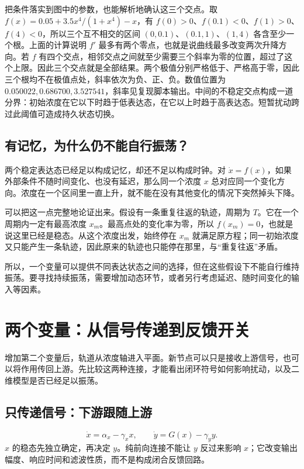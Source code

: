 \documentclass[11pt,a4paper,UTF8,fontset=fandol]{ctexart}
\begin{document}
把条件落实到图中的参数，也能解析地确认这三个交点。取 $f(x)=0.05+3.5x^4/(1+x^4)-x$，有 $f(0)>0$、$f(0.1)<0$、$f(1)>0$、$f(4)<0$，所以三个互不相交的区间 $(0,0.1)$、$(0.1,1)$、$(1,4)$ 各含至少一个根。上面的计算说明 $f'$ 最多有两个零点，也就是说曲线最多改变两次升降方向。若 $f$ 有四个交点，相邻交点之间就至少需要三个斜率为零的位置，超过了这个上限。因此三个交点就是全部结果。两个极值分别严格低于、严格高于零，因此三个根均不在极值点处，斜率依次为负、正、负。数值位置为 $0.050022,0.686700,3.527541$，斜率见复现脚本输出。中间的不稳定交点构成一道分界：初始浓度在它以下时趋于低表达态，在它以上时趋于高表达态。短暂扰动跨过此阈值可造成持久状态切换。

\subsection{有记忆，为什么仍不能自行振荡？}
两个稳定表达态已经足以构成记忆，却还不足以构成时钟。对 $\dot x=f(x)$，如果外部条件不随时间变化、也没有延迟，那么同一个浓度 $x$ 总对应同一个变化方向。浓度在一个区间里一直上升，就不能在没有其他变化的情况下突然掉头下降。

可以把这一点完整地论证出来。假设有一条重复往返的轨迹，周期为 $T$。它在一个周期内一定有最高浓度 $x_m$。最高点处的变化率为零，所以 $f(x_m)=0$，也就是说这里已经是稳态。从这个浓度出发，始终停在 $x_m$ 就满足原方程；同一初始浓度又只能产生一条轨迹，因此原来的轨迹也只能停在那里，与“重复往返”矛盾。

所以，一个变量可以提供不同表达状态之间的选择，但在这些假设下不能自行维持振荡。要寻找持续振荡，需要增加动态环节，或者另行考虑延迟、随时间变化的输入等因素。

\section{两个变量：从信号传递到反馈开关}
增加第二个变量后，轨道从浓度轴进入平面。新节点可以只是接收上游信号，也可以将作用传回上游。先比较这两种连接，才能看出闭环符号如何影响扰动，以及二维模型是否已经足以振荡。
\subsection{只传递信号：下游跟随上游}
\begin{equation}\dot x=\alpha_x-\gamma_xx,\qquad\dot y=G(x)-\gamma_yy.\end{equation}
$x$ 的稳态先独立确定，再决定 $y$。纯前向连接不能让 $y$ 反过来影响 $x$；它改变输出幅度、响应时间和滤波性质，而不是构成闭合反馈回路。
\end{document}
